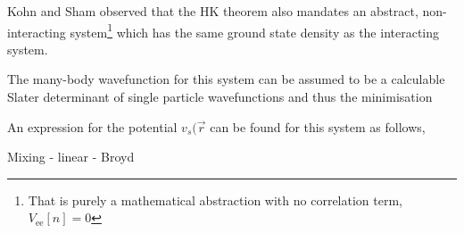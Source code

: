
Kohn and Sham observed that the \ac{HK} theorem also mandates an abstract, non-interacting system\footnote{That is purely a mathematical abstraction with no correlation term, $V_{\textrm{ee}}[n] = 0$} which has the same ground state density as the interacting system.


The many-body wavefunction for this system can be assumed to be a calculable Slater determinant of single particle wavefunctions and thus the minimisation 


An expression for the potential $v_s(\vec{r}$ can be found for this system as follows,

Mixing - linear - Broyd

